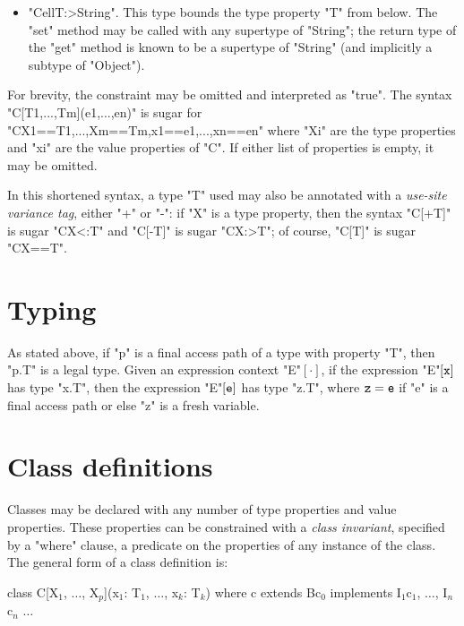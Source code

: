 \documentclass{llncs}
\begin{document}
\begin{itemize}
\item \xcd"Cell{T:>String}".  This type bounds the type property
\xcd"T"
from below.  The \xcd"set" method may be called with any
supertype of \xcd"String"; the return type of the \xcd"get"
method is known to be a
supertype of \xcd"String" (and implicitly a subtype of \xcd"Object").
\end{itemize}

For brevity, the constraint may be omitted and
interpreted as \xcd"true".
The syntax 
\xcd"C[T1,...,Tm](e1,...,en)" is sugar for
\xcd"C{X1==T1,...,Xm==Tm,x1==e1,...,xn==en}"
where \xcd"Xi" are the type properties and \xcd"xi" are the
value properties of \xcd"C".  
If either list of properties is empty, it may be omitted.

In this shortened syntax, a type \xcd"T" used may also be annotated
with
a \emph{use-site variance tag}, either \xcd"+" or \xcd"-":
if \xcd"X" is a type property, then
the syntax \xcd"C[+T]" is sugar \xcd"C{X<:T}" and
\xcd"C[-T]" is sugar \xcd"C{X:>T}"; of course,
\xcd"C[T]" is sugar \xcd"C{X==T}".

\section{Typing}

As stated above, if \xcd"p" is a final access path of a
type with property \xcd"T", then \xcd"p.T" is a legal type.
Given an expression context \xcd"E"$[\cdot]$, if
the expression \xcd"E"$[{\tt x}]$ has type \xcd"x.T",
then the expression \xcd"E"$[{\tt e}]$ has type \xcd"z.T",
where ${\tt z} = {\tt e}$ if \xcd"e" is a final access path
or else \xcd"z" is a fresh variable.
\fi

\section{Class definitions}

Classes may be declared with any number of type properties and
value properties.  These properties can be constrained with a
\emph{class invariant}, specified by a \xcd"where" clause,
a predicate on the properties of any instance of the class.
%
The general form of a class definition is:
\begin{xtenmath}
class C[X$_1$, $\dots$, X$_p$](x$_1$: T$_1$, $\dots$, x$_k$: T$_k$)
      where c
      extends B{c$_0$}
      implements I$_1${c$_1$}, $\dots$, I$_n${c$_n$} {$\dots$}
\end{xtenmath}
\end{document}
